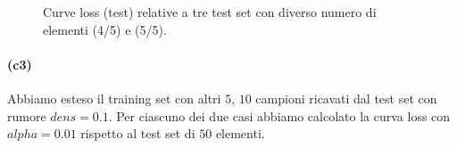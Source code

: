 \documentclass[a4paper,12pt]{article}
\begin{document}
\begin{figure}[htp]
    \centering

    \medskip


    \caption{Curve loss (test) relative a tre test set con diverso numero di elementi (4/5) e (5/5).}
    \label{fig:c2-3}
\end{figure}



\newpage
\paragraph{(c3)} Abbiamo esteso il training set con altri $5$, $10$ campioni ricavati dal test set con rumore $dens=0.1$. Per ciascuno dei due casi abbiamo calcolato la curva loss con $alpha=0.01$ rispetto al test set di $50$ elementi.
\end{document}
